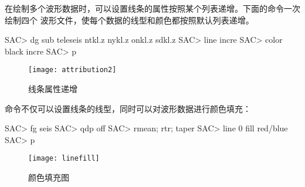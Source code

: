 在绘制多个波形数据时，可以设置线条的属性按照某个列表递增。下面的命令一次绘制四个
波形文件，使每个数据的线型和颜色都按照默认列表递增。
\begin{SACCode}
SAC> dg sub teleseis ntkl.z nykl.z onkl.z sdkl.z
SAC> line incre
SAC> color black incre
SAC> p
\end{SACCode}

\begin{figure}[H]
\centering
\texttt{[image: attribution2]}
\caption{线条属性递增}
\end{figure}

 命令不仅可以设置线条的线型，同时可以对波形数据进行颜色填充：
\begin{SACCode}
SAC> fg seis
SAC> qdp off
SAC> rmean; rtr; taper
SAC> line 0 fill red/blue
SAC> p
\end{SACCode}

\begin{figure}[H]
\centering
\texttt{[image: linefill]}
\caption{颜色填充图}
\end{figure}
